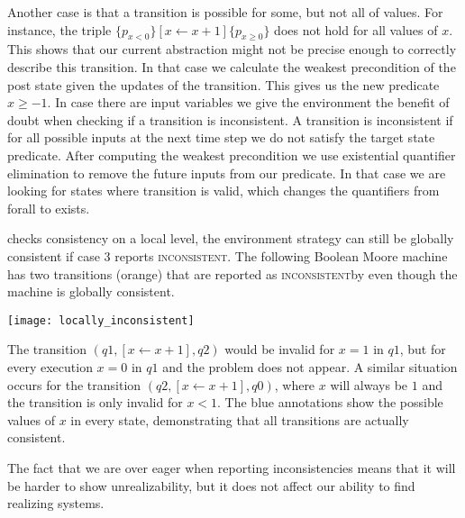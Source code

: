 \documentclass[runningheads]{llncs}
\newcommand{\theory}{\mathcal{T}}
\newcommand{\bool}{\mathcal{B}}
\newcommand{\updf}{\mathbf{u}}
\newcommand{\inconsistent}{\textsc{inconsistent}}
\begin{document}
Another case is that a transition is possible for some, but not all of values. For instance, the triple $\{p_{x<0}\} [x \leftarrow x+1] \{p_{x \geq 0}\}$ does not hold for all values of $x$. This shows that our current abstraction might not be precise enough to correctly describe this transition. In that case we calculate the weakest precondition of the post state given the updates of the transition. This gives us the new predicate $x\geq-1$. In case there are input variables we give the environment the benefit of doubt when checking if a transition is inconsistent. A transition is inconsistent if for all possible inputs at the next time step we do not satisfy the target state predicate. After computing the weakest precondition we use existential quantifier elimination to remove the future inputs from our predicate. In that case we are looking for states where transition is valid, which changes the quantifiers from forall to exists.


\begin{example}
 checks consistency on a local level, the environment strategy can still be globally consistent if case 3 reports \inconsistent.
The following Boolean Moore machine has two transitions (orange) that are reported as \inconsistent by  even though the machine is globally consistent.

\texttt{[image: locally\_inconsistent]}

The transition $(q1, [x \leftarrow x+1], q2)$ would be invalid for $x=1$ in $q1$, but for every execution $x=0$ in $q1$ and the problem does not appear. A similar situation occurs for the transition $(q2, [x \leftarrow x+1], q0)$, where $x$ will always be $1$ and the transition is only invalid for $x<1$.
The blue annotations show the possible values of $x$ in every state, demonstrating that all transitions are actually consistent.

The fact that we are over eager when reporting inconsistencies means that it will be harder to show unrealizability, but it does not affect our ability to find realizing systems.
\end{example}
\end{document}
